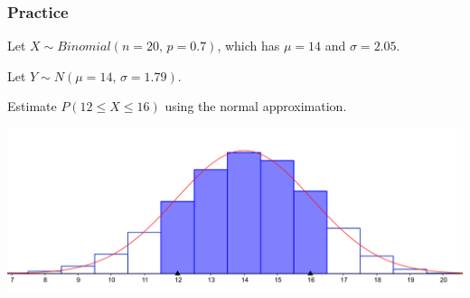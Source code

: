 \begin{frame}
\frametitle{Practice}
Let $X\sim Binomial(n=20,\,p=0.7)$, which has $\mu = 14$ and $\sigma = 2.05$. \pause

Let $Y\sim N(\mu=14,\, \sigma=1.79)$. \pause

Estimate $P(12 \le X \le 16)$ using the normal approximation.
\begin{center}
\includegraphics[scale=0.08]{3-4_binomial_distribution/figures/bin_norm/geogebra-export2.png}
\end{center}
\pause
{}
\pause
{}~~\pause~~
\pause
{}

\end{frame}







